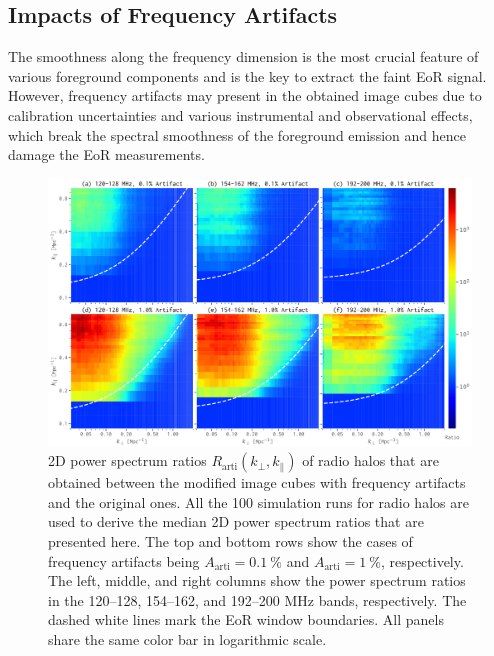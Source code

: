 \documentclass[twocolumn]{aastex62}
\newcommand{\R}[1]{\mathrm{#1}}
\newcommand{\klos}{\text{$k_{\parallel}$}}
\newcommand{\kperp}{\text{$k_{\bot}$}}
\begin{document}
\subsection{Impacts of Frequency Artifacts}
\label{sec:freq-artifacts}

The smoothness along the frequency dimension is the most crucial feature
of various foreground components and is the key to extract the faint EoR
signal.
However, frequency artifacts may present in the obtained image cubes due
to calibration uncertainties and various instrumental and observational
effects, which break the spectral smoothness of the foreground emission
and hence damage the EoR measurements.

\begin{figure}
  \centering
  \includegraphics[width=\textwidth]{ps2d-ratio-crp-halos-3bands}
  \caption{\label{fig:ps2d-ratio-crp}%
    2D power spectrum ratios $R_{\R{arti}}(\kperp, \klos)$ of radio
    halos that are obtained between the modified image cubes with
    frequency artifacts and the original ones.
    All the 100 simulation runs for radio halos are used to derive
    the median 2D power spectrum ratios that are presented here.
    The top and bottom rows show the cases of frequency artifacts
    being $A_{\R{arti}} = \SI{0.1}{\percent}$ and
    $A_{\R{arti}} = \SI{1}{\percent}$, respectively.
    The left, middle, and right columns show the power spectrum ratios
    in the \numrange{120}{128}, \numrange{154}{162}, and
    \numrange{192}{200} \si{\MHz} bands, respectively.
    The dashed white lines mark the EoR window boundaries.
    All panels share the same color bar in logarithmic scale.
  }
\end{figure}
\end{document}
